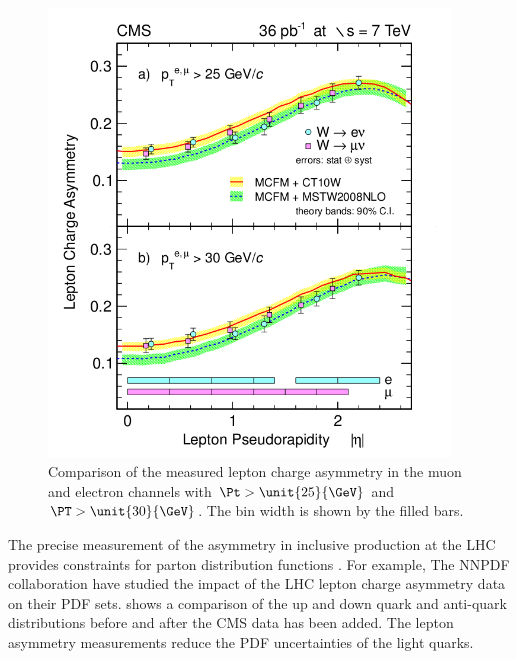 \begin{figure}[htbp]
  \begin{center}
  \includegraphics*[width=0.95\textwidth]{combined}
  \caption[Comparison of the measured lepton charge asymmetry in the muon and
electron channels] { Comparison of the measured lepton charge asymmetry in the
muon and electron channels with $\Pt>\unit{25}{\GeV}$ and $\PT>\unit{30}{\GeV}$.
The bin width is shown by the filled bars\cite{asym36}.}
  \label{fig:combined}
  \end{center}
\end{figure}

The precise measurement of the asymmetry in inclusive \PW production at the LHC
provides constraints for parton distribution functions \cite{asym840}.
For example, The NNPDF collaboration \cite{Lionetti:2011pw} have studied the
impact of the LHC \PW lepton charge asymmetry data on their PDF
sets\cite{Ball:2011gg}.  shows a comparison of the up and
down quark and anti-quark distributions before and after the CMS data has been
added\cite{Ball:2011gg}.  The lepton asymmetry measurements reduce the PDF
uncertainties of the light quarks.

